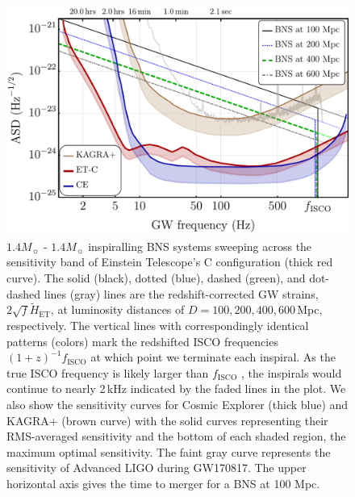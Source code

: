 \documentclass{aa}
\begin{document}
\begin{figure}
\sidecaption
\includegraphics[width=12cm]{../Figs/ET_strains_redshifted_v4.pdf}
\caption{%
$1.4 M_\sun$ - $1.4 M_\sun$ inspiralling BNS systems sweeping across the sensitivity band of Einstein Telescope's C configuration (thick red curve).
The solid (black), dotted (blue), dashed (green), and dot-dashed lines (gray) lines are the redshift-corrected GW strains, $2\sqrt{f}\tilde{H}_\text{ET}$, at luminosity distances of $D=100, 200, 400, 600\,$Mpc, respectively. 
The vertical lines with correspondingly identical patterns (colors) mark the redshifted ISCO frequencies $(1+z)^{-1} f_\text{ISCO}$ at which point we terminate each inspiral.
As the true ISCO frequency is likely larger than $f_\text{ISCO}$ \citep{Marronetti:2003hx}, the inspirals would continue to nearly 2\,kHz indicated by the faded lines in the plot.
We also show the sensitivity curves for Cosmic Explorer (thick blue) and KAGRA+ (brown curve) with the solid curves representing their RMS-averaged sensitivity and the bottom of each shaded region, the maximum optimal sensitivity.
The faint gray curve represents the sensitivity of Advanced LIGO during GW170817.
The upper  horizontal axis gives the time to merger for a BNS at 100 Mpc.
}
\label{fig:ETB2030}
\end{figure}
%
%
%
\end{document}

